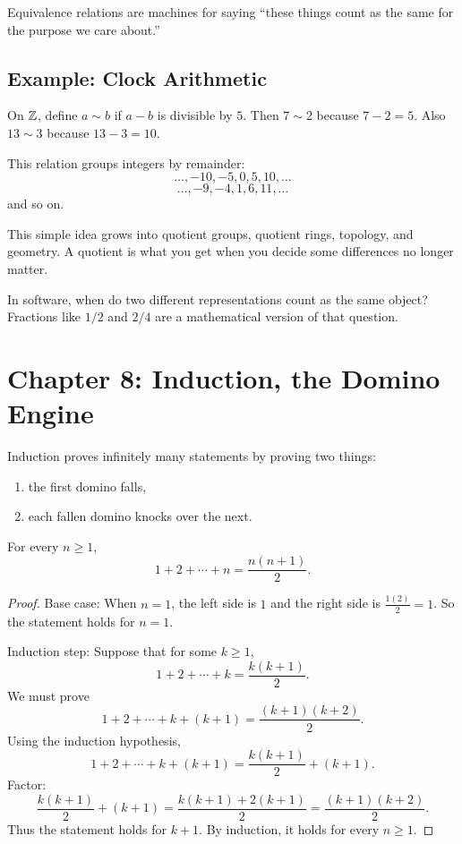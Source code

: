 \documentclass[11pt]{article}
\begin{document}
Equivalence relations are machines for saying ``these things count as the same for the purpose we care about.''

\subsection{Example: Clock Arithmetic}

On $\mathbb{Z}$, define $a\sim b$ if $a-b$ is divisible by $5$. Then $7\sim 2$ because $7-2=5$. Also $13\sim 3$ because $13-3=10$.

This relation groups integers by remainder:
\[
\ldots,-10,-5,0,5,10,\ldots
\]
\[
\ldots,-9,-4,1,6,11,\ldots
\]
and so on.

This simple idea grows into quotient groups, quotient rings, topology, and geometry. A quotient is what you get when you decide some differences no longer matter.

\begin{walkbox}
In software, when do two different representations count as the same object? Fractions like $1/2$ and $2/4$ are a mathematical version of that question.
\end{walkbox}

\section{Chapter 8: Induction, the Domino Engine}

Induction proves infinitely many statements by proving two things:

\begin{enumerate}
\item the first domino falls,
\item each fallen domino knocks over the next.
\end{enumerate}

\begin{theorem}
For every $n\geq 1$,
\[
1+2+\cdots+n=\frac{n(n+1)}{2}.
\]
\end{theorem}

\begin{proof}
Base case: When $n=1$, the left side is $1$ and the right side is $\frac{1(2)}{2}=1$. So the statement holds for $n=1$.

Induction step: Suppose that for some $k\geq 1$,
\[
1+2+\cdots+k=\frac{k(k+1)}{2}.
\]
We must prove
\[
1+2+\cdots+k+(k+1)=\frac{(k+1)(k+2)}{2}.
\]
Using the induction hypothesis,
\[
1+2+\cdots+k+(k+1)=\frac{k(k+1)}{2}+(k+1).
\]
Factor:
\[
\frac{k(k+1)}{2}+(k+1)=\frac{k(k+1)+2(k+1)}{2}
=\frac{(k+1)(k+2)}{2}.
\]
Thus the statement holds for $k+1$. By induction, it holds for every $n\geq 1$.
\end{proof}
\end{document}
